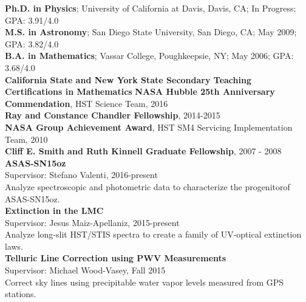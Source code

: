 \documentclass[10pt]{cv}
\begin{document}
\begin{llist}
\vspace{0.1in} 
   {\bf Ph.D. in Physics}; University of California at Davis, Davis, CA; In Progress; GPA: 3.91/4.0 \\
   {\bf M.S. in Astronomy}; San Diego State University, San Diego, CA; May 2009; GPA: 3.82/4.0 \\
   {\bf B.A. in Mathematics}; Vassar College, Poughkeepsie, NY; May 2006; GPA: 3.68/4.0 \\   
   {\bf California State and New York State Secondary Teaching Certifications in Mathematics} 
{\bf NASA Hubble 25th Anniversary Commendation}, HST Science Team, 2016 \\ %
{\bf Ray and Constance Chandler Fellowship}, 2014-2015 \\
{\bf NASA Group Achievement Award}, HST SM4 Servicing Implementation Team, 2010 \\
{\bf Cliff E. Smith and Ruth Kinnell Graduate Fellowship}, 2007 - 2008 
%    
{\bf ASAS-SN15oz} \hspace{179pt} \\
\hspace*{24pt}Supervisor: Stefano Valenti, 2016-present\\
\hspace*{24pt}Analyze spectroscopic and photometric data to characterize the progenitorof ASAS-SN15oz.\\
{\bf Extinction in the LMC}\hspace{149.95pt} \\
\hspace*{24pt}Supervisor: Jesus Maiz-Apellaniz, 2015-present\\
\hspace*{24pt}Analyze long-slit HST/STIS spectra to create a family of UV-optical extinction laws. \\
{\bf Telluric Line Correction using PWV Measurements} \hspace{2pt} \\
\hspace*{24pt}Supervisor: Michael Wood-Vasey, Fall 2015\\
\hspace*{24pt}Correct sky lines using precipitable water vapor levels measured from GPS stations. \\

\end{llist}
\end{document}
